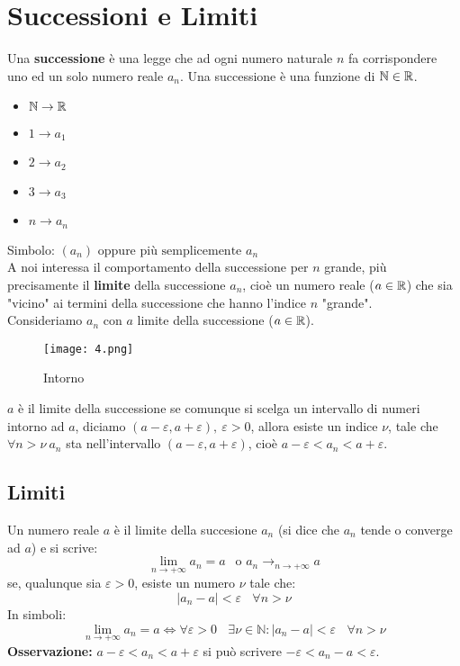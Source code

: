 \documentclass[../../main.tex]{subfiles}
\begin{document}
\section{Successioni e Limiti}
Una \textbf{successione} è una legge che ad ogni numero naturale $n$ fa
corrispondere uno ed un solo numero reale $a_n$. Una successione è una funzione
di $\mathbb{N} \in \mathbb{R}$.
\begin{itemize}
    \item $\mathbb{N} \to \mathbb{R}$
    \item $1 \to a_1$
    \item $2 \to a_2$
    \item $3 \to a_3$
    \item $n \to a_n$
\end{itemize}
Simbolo: $(a_n) \text{ oppure più semplicemente } a_n$\\
A noi interessa il comportamento della successione per $n$ grande, più precisamente il \textbf{limite} della successione $a_n$, cioè un numero reale ($a \in \mathbb{R}$) che sia "vicino" ai termini della successione che hanno l'indice $n$ "grande".\\
Consideriamo $a_n$ con $a$ limite della successione ($a \in \mathbb{R}$).
\begin{figure}[h!]
    \centering
    \texttt{[image: 4.png]}
    \caption{Intorno}
    \label{fig:4}
\end{figure}
$a$ è il limite della successione se comunque si scelga un intervallo di numeri intorno ad $a$, diciamo $(a-\varepsilon, a+\varepsilon), \ \varepsilon > 0$, allora esiste un indice $\nu$, tale che $\forall n > \nu \ a_n$ sta nell'intervallo $(a-\varepsilon, a+\varepsilon)$, cioè $a-\varepsilon < a_n < a+\varepsilon$.

\subsection{Limiti}
Un numero reale $a$ è il limite della succesione $a_n$ (si dice che $a_n$ tende
o converge ad $a$) e si scrive:
\[
    \lim_{n\to +\infty} a_n = a \ \ \text{ o } a_n \to_{n\to+\infty} a
\]
se, qualunque sia $\varepsilon > 0$, esiste un numero $\nu$ tale che:
\[
    |a_n - a| < \varepsilon \ \ \ \ \forall n > \nu
\]
In simboli:
\[
    \lim_{n\to+\infty}a_n = a \iff \forall \varepsilon > 0 \ \ \ \ \exists \nu \in \mathbb{N} : |a_n - a| < \varepsilon \ \ \ \ \forall n > \nu
\]
\textbf{Osservazione:} $a-\varepsilon < a_n < a+\varepsilon$ si può scrivere $-\varepsilon < a_n - a < \varepsilon$.\\
\end{document}
